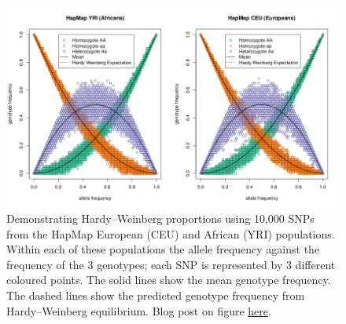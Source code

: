 \begin{figure}[!h]
\begin{center}
\includegraphics[width= \textwidth]{figures/CEU_YRI_separately_HWE.png}
\end{center}
\caption{Demonstrating Hardy--Weinberg proportions using 10,000 SNPs
  from the HapMap European (CEU)  and African (YRI) populations. Within
  each of these populations the allele frequency against the
  frequency of the 3 genotypes; each SNP is represented by 3 different
  coloured points. The solid lines show the mean genotype frequency. The dashed lines show the
  predicted genotype frequency from Hardy--Weinberg
  equilibrium.  Blog
  post on figure \href{http://gcbias.org/2011/10/13/population-genetics-course-resources-Hardy--Weinberg-eq/}{here}. } \label{fig:HWE_CEU_YRI}  %
\end{figure}





